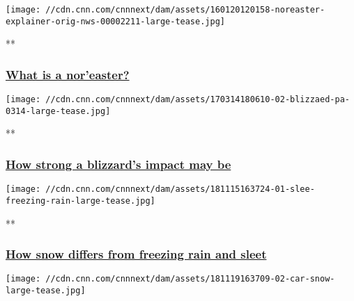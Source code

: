 \href{/videos/weather/2016/01/20/noreaster-explainer-orig-nws.cnn}{}

\texttt{[image: //cdn.cnn.com/cnnnext/dam/assets/160120120158-noreaster-explainer-orig-nws-00002211-large-tease.jpg]}

**

\hypertarget{what-is-a-noreaster}{%
\subsubsection{\texorpdfstring{\href{/videos/weather/2016/01/20/noreaster-explainer-orig-nws.cnn}{What
is a nor'easter?}}{What is a nor'easter?}}\label{what-is-a-noreaster}}

\href{/videos/weather/2018/03/01/what-is-a-blizzard-explainer-orig-llr.cnn}{}

\texttt{[image: //cdn.cnn.com/cnnnext/dam/assets/170314180610-02-blizzaed-pa-0314-large-tease.jpg]}

**

\hypertarget{how-strong-a-blizzards-impact-may-be}{%
\subsubsection{\texorpdfstring{\href{/videos/weather/2018/03/01/what-is-a-blizzard-explainer-orig-llr.cnn}{How
strong a blizzard's impact may
be}}{How strong a blizzard's impact may be}}\label{how-strong-a-blizzards-impact-may-be}}

\href{/videos/weather/2018/11/15/what-is-sleet-freezing-rain-explainer-gray-llr-wx-ncc-orig.cnn}{}

\texttt{[image: //cdn.cnn.com/cnnnext/dam/assets/181115163724-01-slee-freezing-rain-large-tease.jpg]}

**

\hypertarget{how-snow-differs-from-freezing-rain-and-sleet}{%
\subsubsection{\texorpdfstring{\href{/videos/weather/2018/11/15/what-is-sleet-freezing-rain-explainer-gray-llr-wx-ncc-orig.cnn}{How
snow differs from freezing rain and
sleet}}{How snow differs from freezing rain and sleet}}\label{how-snow-differs-from-freezing-rain-and-sleet}}

\href{/videos/weather/2018/11/19/winter-car-survival-explainer-wx-ncc-orig.cnn}{}

\texttt{[image: //cdn.cnn.com/cnnnext/dam/assets/181119163709-02-car-snow-large-tease.jpg]}

